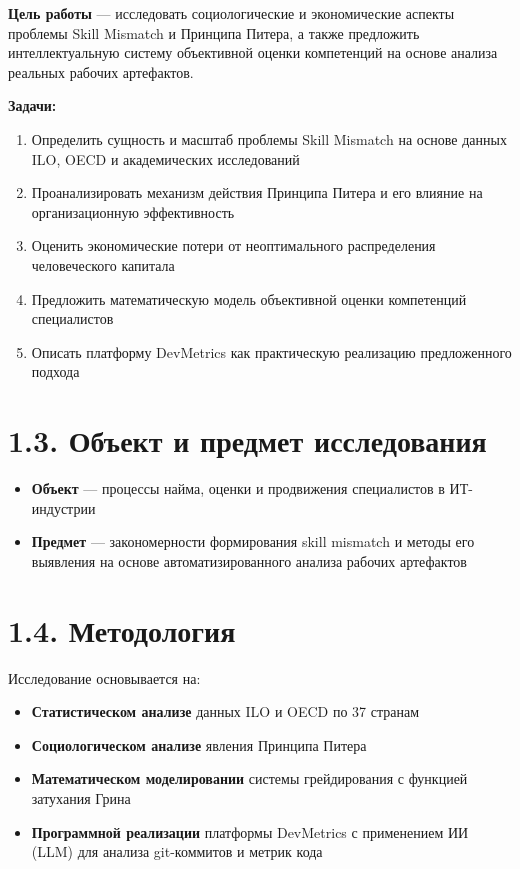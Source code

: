 \documentclass[
  russian,
  12pt,
]{report}
\providecommand{\tightlist}{%
  \setlength{\itemsep}{0pt}\setlength{\parskip}{0pt}}
\begin{document}
\textbf{Цель работы} --- исследовать социологические и экономические
аспекты проблемы Skill Mismatch и Принципа Питера, а также предложить
интеллектуальную систему объективной оценки компетенций на основе
анализа реальных рабочих артефактов.

\textbf{Задачи:}

\begin{enumerate}
\def\labelenumi{\arabic{enumi}.}
\tightlist
\item
  Определить сущность и масштаб проблемы Skill Mismatch на основе данных
  ILO, OECD и академических исследований
\item
  Проанализировать механизм действия Принципа Питера и его влияние на
  организационную эффективность
\item
  Оценить экономические потери от неоптимального распределения
  человеческого капитала
\item
  Предложить математическую модель объективной оценки компетенций
  специалистов
\item
  Описать платформу DevMetrics как практическую реализацию предложенного
  подхода
\end{enumerate}

\section{1.3. Объект и предмет
исследования}\label{ux43eux431ux44aux435ux43aux442-ux438-ux43fux440ux435ux434ux43cux435ux442-ux438ux441ux441ux43bux435ux434ux43eux432ux430ux43dux438ux44f}

\begin{itemize}
\tightlist
\item
  \textbf{Объект} --- процессы найма, оценки и продвижения специалистов
  в ИТ-индустрии
\item
  \textbf{Предмет} --- закономерности формирования skill mismatch и
  методы его выявления на основе автоматизированного анализа рабочих
  артефактов
\end{itemize}

\section{1.4.
Методология}\label{ux43cux435ux442ux43eux434ux43eux43bux43eux433ux438ux44f}

Исследование основывается на:

\begin{itemize}
\tightlist
\item
  \textbf{Статистическом анализе} данных ILO и OECD по 37 странам
\item
  \textbf{Социологическом анализе} явления Принципа Питера
\item
  \textbf{Математическом моделировании} системы грейдирования с функцией
  затухания Грина
\item
  \textbf{Программной реализации} платформы DevMetrics с применением ИИ
  (LLM) для анализа git-коммитов и метрик кода
\end{itemize}

\newpage
\end{document}
